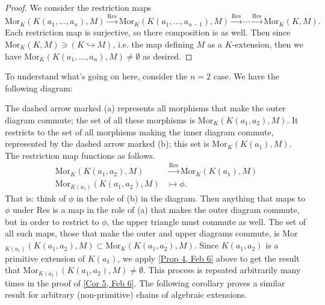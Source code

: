 \begin{proof}
We consider the restriction maps
\[\text{Mor}_K(K(a_1, ..., a_n), M) \stackrel{\text{Res}}{\rightarrow} \text{Mor}_K(K(a_1, ..., a_{n-1}), M) \stackrel{\text{Res}}{\rightarrow} \cdots \stackrel{\text{Res}}{\rightarrow} \text{Mor}_K(K, M).\]
Each restriction map is surjective, so there composition is as well. Then since Mor$_K(K, M) \ni (K \hookrightarrow M)$, i.e. the map defining $M$ as a $K$-extension, then we have $\text{Mor}_K(K(a_1, ..., a_n), M) \neq \emptyset$ as desired.
\end{proof}

\begin{rmk}
To understand what's going on here, consider the $n=2$ case. We have the following diagram:
\begin{center}
\end{center}
The dashed arrow marked (a) represents all morphisms that make the outer diagram commute; the set of all these morphisms is Mor$_K(K(a_1, a_2), M)$. It restricts to the set of all morphisms making the inner diagram commute, represented by the dashed arrow marked (b); this set is Mor$_K(K(a_1), M)$. The restriction map functions as follows.
\begin{align*}
\text{Mor}_K(K(a_1, a_2), M) &\stackrel{\text{Res}}{\rightarrow} \text{Mor}_K(K(a_1), M) \\
\text{Mor}_{K(a_1)}(K(a_1, a_2), M) &\mapsto \phi.
\end{align*}
That is: think of $\phi$ in the role of (b) in the diagram. Then anything that maps to $\phi$ under Res is a map in the role of (a) that makes the outer diagram commute, but in order to restrict to $\phi$, the upper triangle must commute as well. The set of all such maps, those that make the outer and upper diagrams commute, is Mor$_{K(a_1)}(K(a_1, a_2), M) \subset \text{Mor}_K(K(a_1, a_2), M)$. Since $K(a_1, a_2)$ is a primitive extension of $K(a_1)$, we apply \ref{Prop 4, Feb 6} above to get the result that Mor$_{K(a_1)}(K(a_1, a_2), M) \neq \emptyset$. This process is repeated arbitrarily many times in the proof of \ref{Cor 5, Feb 6}. The following corollary proves a similar result for arbitrary (non-primitive) chains of algebraic extensions.
\end{rmk}

